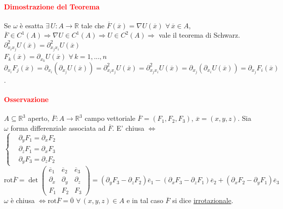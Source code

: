 \documentclass{article}
\newcommand{\R}{\mathbb{R}}
\begin{document}
\paragraph{\textcolor{red}{Dimostrazione del Teorema}}
Se $\omega$ è esatta $\exists \, U : A\rightarrow \R$ tale che $\overline{F}(\overline{x})=\nabla U(\overline{x})\,\, \forall\, \overline{x}\in A$, $\overline{F}\in C^1(A)\Rightarrow \nabla U \in C^1(A) \Rightarrow U \in C^2(A)\Rightarrow $ vale il teorema di Schwarz. \\
$\partial_{x_ix_j}^2U(\overline{x})=\partial_{x_jx_i}^2U(\overline{x})$\\
$F_k(\overline{x})=\partial_{x_k}U(\overline{x})\,\, \forall \, k =1,...,n$\\
$\partial_{x_i}F_j(\overline{x})=\partial_{x_i}(\partial_{x_j}U(\overline{x}))=\partial_{x_ix_j}^2U(\overline{x})=\partial_{x_jx_i}^2U(\overline{x})=\partial_{x_j}(\partial_x_iU(\overline{x}))=\partial_{x_j}F_i(\overline{x})$.
\begin{flushright}
    \Lightning
\end{flushright}

\paragraph{\textcolor{red}{Osservazione}}
$A \subseteq \R^3$ aperto, $\overline{F}: A \rightarrow \R^3$ campo vettoriale $\overline{F}= (F_1,F_2,F_3)$, $\overline{x}=(x,y,z)$. Sia $\omega$ forma differenziale associata ad $\overline{F}$. E' chiusa $\Leftrightarrow$\\
$\begin{cases}
    &\partial_yF_1=\partial_xF_2\\
    &\partial_zF_1=\partial_x F_3\\
    &\partial_yF_3= \partial_z F_2
\end{cases}$\\
$\text{rot}\overline{F}=\det \begin{pmatrix}
    \overline{e}_1 & \overline{e}_2 & \overline{e}_3\\
    \partial_x &\partial_y &\partial_z\\
    F_1 &F_2 &F_3
\end{pmatrix}= (\partial_yF_3-\partial_zF_2)\overline{e}_1-(\partial_xF_3-\partial_zF_1)\overline{e}_2+(\partial_xF_2-\partial_yF_1)\overline{e}_3$\\
$\omega $ è chiusa $\Leftrightarrow \text{rot}\overline{F}=\overline{0}\,\, \forall \, (x,y,z)\in A$ e in tal caso $\overline{F}$ si dice \underline{irrotazionale}.
\end{document}
